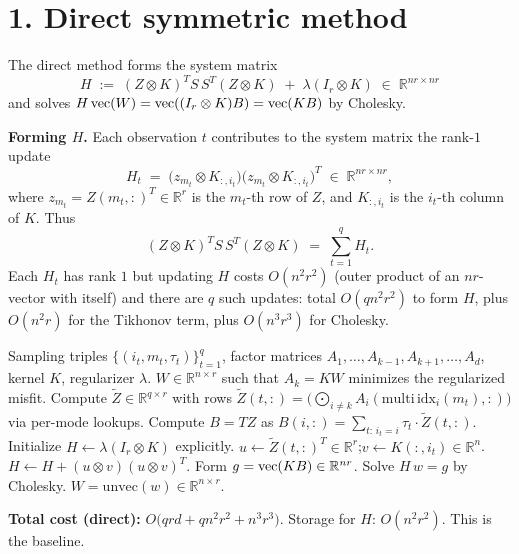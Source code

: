 \section*{1. Direct symmetric method}

The direct method forms the system matrix
\[
H \;:=\; (Z\otimes K)^T S\,S^T(Z\otimes K) \;+\;\lambda(I_r\otimes K)\;\in\;\mathbb R^{nr\times nr}
\]
and solves $H\operatorname{vec}(W)=\operatorname{vec}((I_r\otimes K)B)=\operatorname{vec}(KB)$ by Cholesky.

\medskip
\noindent\textbf{Forming $H$.}  Each observation $t$ contributes to the system matrix the rank-$1$ update
\[
H_t \;=\;\bigl(z_{m_t}\otimes K_{:,i_t}\bigr)\bigl(z_{m_t}\otimes K_{:,i_t}\bigr)^T \;\in\;\mathbb R^{nr\times nr},
\]
where $z_{m_t}=Z(m_t,:)^T\in\mathbb R^r$ is the $m_t$-th row of $Z$, and $K_{:,i_t}$ is the $i_t$-th column of $K$.  Thus
\[
(Z\otimes K)^T S\,S^T(Z\otimes K)\;=\;\sum_{t=1}^q H_t.
\]
Each $H_t$ has rank $1$ but updating $H$ costs $O(n^2 r^2)$ (outer product of an $nr$-vector with itself) and there are $q$ such updates: total $O(qn^2r^2)$ to form $H$, plus $O(n^2r)$ for the Tikhonov term, plus $O(n^3r^3)$ for Cholesky.

\medskip

\begin{algorithm}[H]
\caption{Direct symmetric solve for the RKHS mode-$k$ subproblem}
\begin{algorithmic}[1]
\Require Sampling triples $\{(i_t,m_t,\tau_t)\}_{t=1}^q$, factor matrices $A_1,\ldots,A_{k-1},A_{k+1},\ldots,A_d$, kernel $K$, regularizer $\lambda$.
\Ensure $W\in\mathbb R^{n\times r}$ such that $A_k=KW$ minimizes the regularized misfit.
\State Compute $\widetilde Z\in\mathbb R^{q\times r}$ with rows $\widetilde Z(t,:)=\bigl(\bigodot_{i\ne k} A_i(\mathrm{multi\,idx}_i(m_t),:)\bigr)$ via per-mode lookups. 
\State Compute $B=T Z$ as $B(i,:)=\sum_{t:\,i_t=i}\tau_t\cdot\widetilde Z(t,:)$. 
\State Initialize $H\gets \lambda(I_r\otimes K)$ explicitly. 
  \State $u\gets \widetilde Z(t,:)^T\in\mathbb R^r$;\quad $v\gets K(:,i_t)\in\mathbb R^n$.
  \State $H \gets H + (u\otimes v)(u\otimes v)^T$. 
\EndFor
\State Form $g=\operatorname{vec}(KB)\in\mathbb R^{nr}$. 
\State Solve $H\,w=g$ by Cholesky. 
\State \Return $W=\mathrm{unvec}(w)\in\mathbb R^{n\times r}$.
\end{algorithmic}
\end{algorithm}

\noindent\textbf{Total cost (direct):} $O\bigl(qrd + qn^2r^2 + n^3r^3\bigr)$.  Storage for $H$: $O(n^2r^2)$.  This is the baseline.

